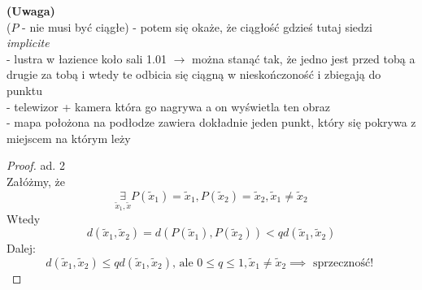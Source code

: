 \documentclass[../main.tex]{subfiles}
\begin{document}
\begin{przyklad}
    \textbf{(Uwaga)}\\
($P$ - nie musi być ciągłe) - potem się okaże, że ciągłość gdzieś tutaj siedzi \textit{implicite}\\
\noindent- lustra w łazience koło sali 1.01 $\rightarrow$ można stanąć tak, że jedno jest przed tobą a drugie za tobą i wtedy te odbicia się ciągną w nieskończoność i zbiegają do punktu\\
- telewizor + kamera która go nagrywa a on wyświetla ten obraz\\
- mapa położona na podłodze zawiera dokładnie jeden punkt, który się pokrywa z miejscem na którym leży
\end{przyklad}
\begin{proof}
ad. 2\\
Załóżmy, że
    \[
        \underset{\tilde x_1, \tilde x}{\exists} P(\tilde x_1) = \tilde x_1, P(\tilde x_2) = \tilde x_2, \tilde x_1 \neq \tilde x_2
    \]
Wtedy
    \[
        d(\tilde x_1, \tilde x_2) = d(P(\tilde x_1),P(\tilde x_2)) < qd(\tilde x_1, \tilde x_2)
    \]
Dalej:
    \[
        d(\tilde x_1, \tilde x_2) \leq q d(\tilde x_1, \tilde x_2)\text{, ale }0\leq q \leq 1,\tilde x_1 \neq \tilde x_2 \implies \text{ sprzeczność! }
    \]
\end{proof}
\end{document}
